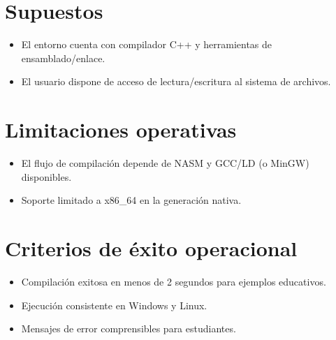 \documentclass[11pt,a4paper]{article}
\begin{document}
\section{Supuestos}
\begin{itemize}
    \item El entorno cuenta con compilador C++ y herramientas de ensamblado/enlace.
    \item El usuario dispone de acceso de lectura/escritura al sistema de archivos.
\end{itemize}

\section{Limitaciones operativas}
\begin{itemize}
    \item El flujo de compilación depende de NASM y GCC/LD (o MinGW) disponibles.
    \item Soporte limitado a x86\_64 en la generación nativa.
\end{itemize}

\section{Criterios de éxito operacional}
\begin{itemize}
    \item Compilación exitosa en menos de 2 segundos para ejemplos educativos.
    \item Ejecución consistente en Windows y Linux.
    \item Mensajes de error comprensibles para estudiantes.
\end{itemize}
\end{document}

